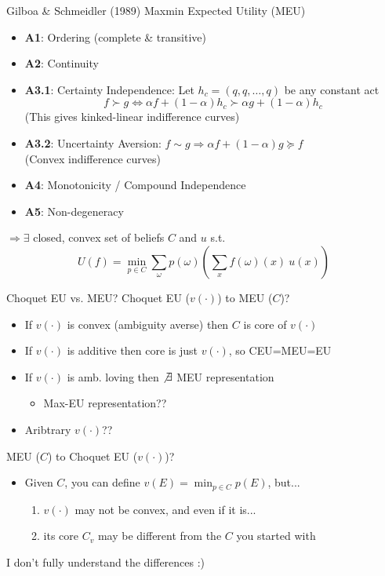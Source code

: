 \begin{frame}{Gilboa \& Schmeidler (1989) Maxmin Expected Utility (MEU)}
    \begin{itemize}
        \item \textbf{A1}: Ordering (complete \& transitive)
        \item \textbf{A2}: Continuity
        \item \textbf{A3.1}: Certainty Independence: Let $h_c=(q,q,\ldots,q)$ be any constant act
        $$
            f\succ g \iff \alpha f + (1-\alpha) h_c \succ \alpha g + (1-\alpha) h_c
        $$
        (This gives kinked-linear indifference curves)
        \item \textbf{A3.2}: Uncertainty Aversion: $f\sim g \Rightarrow \alpha f + (1-\alpha) g \succeq f$\\
        (Convex indifference curves)
        \item \textbf{A4}: Monotonicity / Compound Independence
        \item \textbf{A5}: Non-degeneracy
    \end{itemize}
    $\Rightarrow \exists$ closed, convex set of beliefs $C$ and $u$ s.t.
    $$
        U(f) = \min_{p\in C} \sum_\omega p(\omega) \left( \sum_x f(\omega)(x)\ u(x) \right)
    $$
\end{frame}

\begin{frame}{Choquet EU vs. MEU?}
Choquet EU ($v(\cdot)$) to MEU ($C$)?
\begin{itemize}
    \item If $v(\cdot)$ is convex (ambiguity averse) then $C$ is core of $v(\cdot)$ \checkmark
    \item If $v(\cdot)$ is additive then core is just $v(\cdot)$, so CEU=MEU=EU
    \item If $v(\cdot)$ is amb. loving then $\not\exists$ MEU representation
    \begin{itemize}
        \item Max-EU representation??
    \end{itemize}
    \item Aribtrary $v(\cdot)$??
\end{itemize}
\br
MEU ($C$) to Choquet EU ($v(\cdot)$)?
\begin{itemize}
    \item Given $C$, you can define $v(E)=\min_{p\in C}p(E)$, but...
    \begin{enumerate}
        \item $v(\cdot)$ may not be convex, and even if it is...
        \item its core $C_v$ may be different from the $C$ you started with
    \end{enumerate}
\end{itemize}
\br
I don't fully understand the differences :)
\end{frame}

